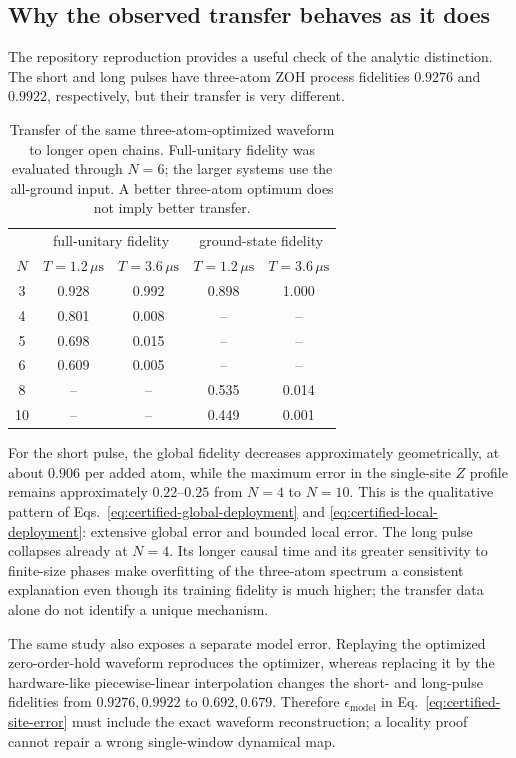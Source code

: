 \subsection{Why the observed transfer behaves as it does}

The repository reproduction provides a useful check of the analytic
distinction.  The short and long pulses have three-atom ZOH process
fidelities $0.9276$ and $0.9922$, respectively, but their transfer is very
different.

\begin{table}[tb]
\centering
\begin{tabular}{c|cc|cc}
\toprule
&\multicolumn{2}{c|}{full-unitary fidelity}
&\multicolumn{2}{c}{ground-state fidelity}\\
$N$ & $T=1.2\,\mu\mathrm{s}$ & $T=3.6\,\mu\mathrm{s}$
& $T=1.2\,\mu\mathrm{s}$ & $T=3.6\,\mu\mathrm{s}$\\
\midrule
3  &0.928&0.992&0.898&1.000\\
4  &0.801&0.008&--&--\\
5  &0.698&0.015&--&--\\
6  &0.609&0.005&--&--\\
8  &--&--&0.535&0.014\\
10 &--&--&0.449&0.001\\
\bottomrule
\end{tabular}
\caption{Transfer of the same three-atom-optimized waveform to longer open
chains.  Full-unitary fidelity was evaluated through $N=6$; the larger systems
use the all-ground input.  A better three-atom optimum does not imply better
transfer.}
\label{tab:zxz-pulse-transfer}
\end{table}

For the short pulse, the global fidelity decreases approximately
geometrically, at about $0.906$ per added atom, while the maximum error in the
single-site $Z$ profile remains approximately $0.22$--$0.25$ from $N=4$ to
$N=10$.  This is the qualitative pattern of
Eqs.~\eqref{eq:certified-global-deployment} and
\eqref{eq:certified-local-deployment}: extensive global error and bounded
local error.  The long pulse collapses already at $N=4$.  Its longer causal
time and its greater sensitivity to finite-size phases make overfitting of the
three-atom spectrum a consistent explanation even though its training
fidelity is much higher; the transfer data alone do not identify a unique
mechanism.

The same study also exposes a separate model error.  Replaying the optimized
zero-order-hold waveform reproduces the optimizer, whereas replacing it by
the hardware-like piecewise-linear interpolation changes the short- and
long-pulse fidelities from $0.9276,0.9922$ to $0.692,0.679$.  Therefore
$\epsilon_{\mathrm{model}}$ in Eq.~\eqref{eq:certified-site-error} must include
the exact waveform reconstruction; a locality proof cannot repair a wrong
single-window dynamical map.

